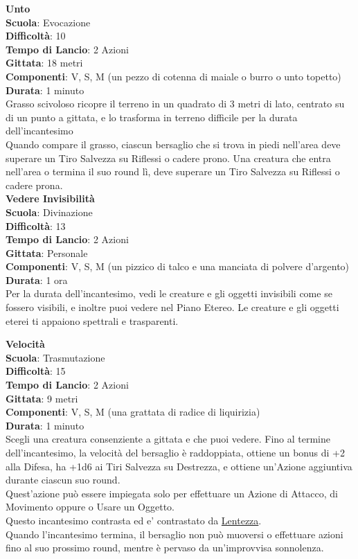 \begin{multicols}{2}
\medskip\textbf{Unto}\\
\textbf{Scuola}: Evocazione\\
\textbf{Difficoltà}: 10\\
\textbf{Tempo di Lancio}: 2 Azioni\\
\textbf{Gittata}: 18 metri\\
\textbf{Componenti}: V, S, M (un pezzo di cotenna di maiale o burro o unto topetto)\\
\textbf{Durata}: 1 minuto\\
Grasso scivoloso ricopre il terreno in un quadrato di 3 metri di lato, centrato su di un punto a gittata, e lo trasforma in terreno difficile per la durata dell'incantesimo\\
Quando compare il grasso, ciascun bersaglio che si trova in piedi nell'area deve superare un Tiro Salvezza su Riflessi o cadere prono. Una creatura che entra nell'area o termina il suo round lì, deve superare un Tiro Salvezza su Riflessi o cadere prona.\\

\medskip\textbf{Vedere Invisibilità}\\
\textbf{Scuola}: Divinazione\\
\textbf{Difficoltà}: 13\\
\textbf{Tempo di Lancio}: 2 Azioni\\
\textbf{Gittata}: Personale\\
\textbf{Componenti}: V, S, M (un pizzico di talco e una manciata di polvere d'argento)\\
\textbf{Durata}: 1 ora\\
Per la durata dell'incantesimo, vedi le creature e gli oggetti invisibili come se fossero visibili, e inoltre puoi vedere nel Piano Etereo. Le creature e gli oggetti eterei ti appaiono spettrali e trasparenti.

\medskip\textbf{Velocità}\\
\textbf{Scuola}: Trasmutazione\\
\textbf{Difficoltà}: 15\\
\textbf{Tempo di Lancio}: 2 Azioni\\
\textbf{Gittata}: 9 metri\\
\textbf{Componenti}: V, S, M (una grattata di radice di liquirizia)\\
\textbf{Durata}: 1 minuto\\
Scegli una creatura consenziente a gittata e che puoi vedere. Fino al termine dell'incantesimo, la velocità del bersaglio è raddoppiata, ottiene un bonus di +2 alla Difesa, ha +1d6 ai Tiri Salvezza su Destrezza, e ottiene un'Azione aggiuntiva durante ciascun suo round.\\
Quest'azione può essere impiegata solo per effettuare un Azione di Attacco, di Movimento oppure o Usare un Oggetto.\\
Questo incantesimo contrasta ed e' contrastato da \hyperlink{lentezza}{Lentezza}.\\
Quando l'incantesimo termina, il bersaglio non può muoversi o effettuare azioni fino al suo prossimo round, mentre è pervaso da un'improvvisa sonnolenza.


\end{multicols}
